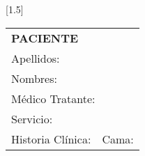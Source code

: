 \documentclass[10pt,a4paper]{article}
\begin{document}
 
\begin{minipage}{10cm}
\begin{flushleft}
\scalebox{1.4}[1.5]{
\begin{tabular}{|p{3cm}p{2.3cm}|}
\hline 
\multicolumn{2}{|l|}{\scriptsize{\textbf{PACIENTE}}}\\
\multicolumn{2}{|p{5.3cm}|}{\scriptsize{Apellidos: }}\\ 
\multicolumn{2}{|p{5.3cm}|}{\scriptsize{Nombres: }}\\ 
\multicolumn{2}{|p{5.3cm}|}{\scriptsize{M\'edico Tratante: }}\\ 
\hline 
\multicolumn{2}{|p{5.3cm}|}{\scriptsize{Servicio: }}\\
\hline 
\scriptsize{Historia Cl\'inica: }&\scriptsize{Cama: } \\ 
\hline 
\end{tabular}}
\end{flushleft}
\end{minipage}
\end{document}
